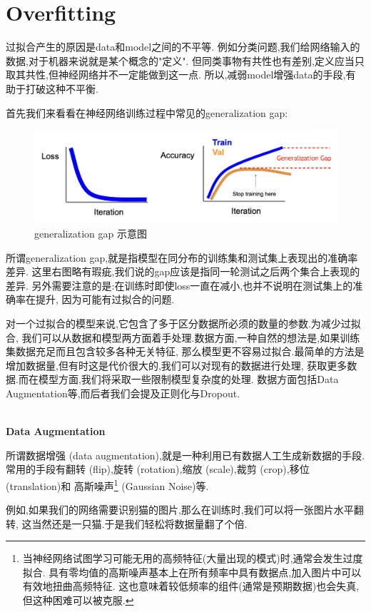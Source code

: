 \section{Overfitting}

过拟合产生的原因是data和model之间的不平等.
例如分类问题,我们给网络输入的数据,对于机器来说就是某个概念的"定义".
但同类事物有共性也有差别,定义应当只取其共性,但神经网络并不一定能做到这一点.
所以,减弱model增强data的手段,有助于打破这种不平衡.

首先我们来看看在神经网络训练过程中常见的generalization gap:
\begin{figure}[htbp]
	\centering
	\includegraphics[scale=0.65]{figures/generalgap.png}
	\caption{generalization gap 示意图}
\end{figure}

所谓generalization gap,就是指模型在同分布的训练集和测试集上表现出的准确率差异.
这里右图略有瑕疵,我们说的gap应该是指同一轮测试之后两个集合上表现的差异.
另外需要注意的是:在训练时即使loss一直在减小,也并不说明在测试集上的准确率在提升,
因为可能有过拟合的问题.

对一个过拟合的模型来说,它包含了多于区分数据所必须的数量的参数.为减少过拟合,
我们可以从数据和模型两方面着手处理.数据方面,一种自然的想法是,如果训练集数据充足而且包含较多各种无关特征,
那么模型更不容易过拟合.最简单的方法是增加数据量,但有时这是代价很大的,我们可以对现有的数据进行处理,
获取更多数据.而在模型方面,我们将采取一些限制模型复杂度的处理.
数据方面包括Data Augmentation等,而后者我们会提及正则化与Dropout.

\textbf{\\Data Augmentation}

所谓数据增强 (data augmentation),就是一种利用已有数据人工生成新数据的手段.
常用的手段有翻转 (flip),旋转 (rotation),缩放 (scale),裁剪 (crop),移位 (translation)和
高斯噪声\footnote{当神经网络试图学习可能无用的高频特征(大量出现的模式)时,通常会发生过度拟合.
具有零均值的高斯噪声基本上在所有频率中具有数据点,加入图片中可以有效地扭曲高频特征.
这也意味着较低频率的组件(通常是预期数据)也会失真,但这种困难可以被克服.} (Gaussian Noise)等.

例如,如果我们的网络需要识别猫的图片,那么在训练时,我们可以将一张图片水平翻转,
这当然还是一只猫.于是我们轻松将数据量翻了个倍.

